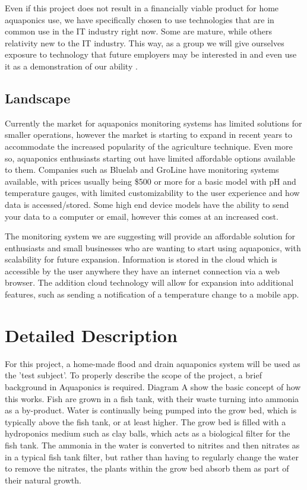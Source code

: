 \documentclass[11pt, oneside, a4paper, titlepage]{article}
\begin{document}
Even if this project does not result in a financially viable product for home aquaponics use, we have specifically chosen to use technologies that are in common use in the IT industry right now. Some are mature, while others relativity new to the IT industry.  This way, as a group we will give ourselves exposure to technology that future employers may be interested in and even use it as a demonstration of our ability .

\subsection{Landscape}
Currently the market for aquaponics monitoring systems has limited solutions for smaller operations, however the market is starting to expand in recent years to accommodate the increased popularity of the agriculture technique. Even more so, aquaponics enthusiasts starting out have limited affordable options available to them. Companies such as Bluelab and GroLine have monitoring systems available, with prices usually being \$500 or more for a basic model with pH and temperature gauges, with limited customizability to the user experience and how data is accessed/stored. Some high end device models have the ability to send your data to a computer or email, however this comes at an increased cost. 

The monitoring system we are suggesting will provide an affordable solution for enthusiasts and small businesses who are wanting to start using aquaponics, with scalability for future expansion. Information is stored in the cloud which is accessible by the user anywhere they have an internet connection via a web browser. The addition cloud technology will allow for expansion into additional features, such as sending a notification of a temperature change to a mobile app. 

\section{Detailed Description}
For this project, a home-made flood and drain aquaponics system will be used as the 'test subject'. To properly describe the scope of the project, a brief background in Aquaponics is required. Diagram A show the basic concept of how this works.  
Fish are grown in a fish tank, with their waste turning into ammonia as a by-product.  Water is continually being pumped into the grow bed, which is typically above the fish tank, or at least higher. The grow bed is filled with a hydroponics medium such as clay balls, which acts as a biological filter for the fish tank. The ammonia in the water is converted to nitrites and then nitrates as in a typical fish tank filter, but rather than having to regularly change the water to remove the nitrates, the plants within the grow bed absorb them as part of their natural growth.  
\end{document}
